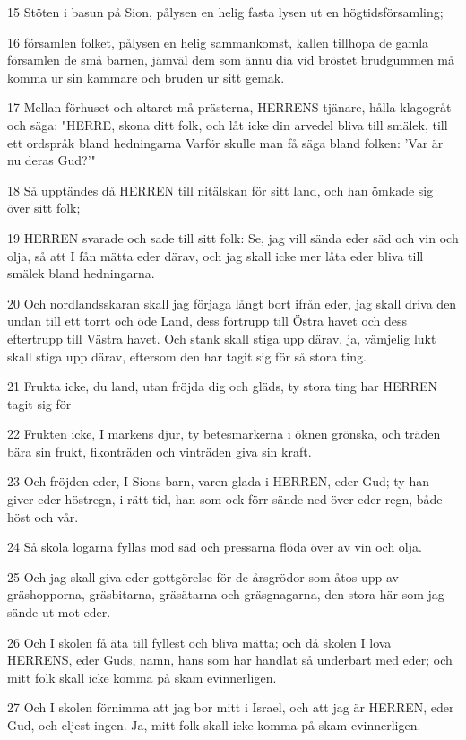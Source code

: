 \par 15 Stöten i basun på Sion, pålysen en helig fasta lysen ut en högtidsförsamling;
\par 16 församlen folket, pålysen en helig sammankomst, kallen tillhopa de gamla församlen de små barnen, jämväl dem som ännu dia vid bröstet brudgummen må komma ur sin kammare och bruden ur sitt gemak.
\par 17 Mellan förhuset och altaret må prästerna, HERRENS tjänare, hålla klagogråt och säga: "HERRE, skona ditt folk, och låt icke din arvedel bliva till smälek, till ett ordspråk bland hedningarna Varför skulle man få säga bland folken: 'Var är nu deras Gud?'"
\par 18 Så upptändes då HERREN till nitälskan för sitt land, och han ömkade sig över sitt folk;
\par 19 HERREN svarade och sade till sitt folk: Se, jag vill sända eder säd och vin och olja, så att I fån mätta eder därav, och jag skall icke mer låta eder bliva till smälek bland hedningarna.
\par 20 Och nordlandsskaran skall jag förjaga långt bort ifrån eder, jag skall driva den undan till ett torrt och öde Land, dess förtrupp till Östra havet och dess eftertrupp till Västra havet. Och stank skall stiga upp därav, ja, vämjelig lukt skall stiga upp därav, eftersom den har tagit sig för så stora ting.
\par 21 Frukta icke, du land, utan fröjda dig och gläds, ty stora ting har HERREN tagit sig för
\par 22 Frukten icke, I markens djur, ty betesmarkerna i öknen grönska, och träden bära sin frukt, fikonträden och vinträden giva sin kraft.
\par 23 Och fröjden eder, I Sions barn, varen glada i HERREN, eder Gud; ty han giver eder höstregn, i rätt tid, han som ock förr sände ned över eder regn, både höst och vår.
\par 24 Så skola logarna fyllas mod säd och pressarna flöda över av vin och olja.
\par 25 Och jag skall giva eder gottgörelse för de årsgrödor som åtos upp av gräshopporna, gräsbitarna, gräsätarna och gräsgnagarna, den stora här som jag sände ut mot eder.
\par 26 Och I skolen få äta till fyllest och bliva mätta; och då skolen I lova HERRENS, eder Guds, namn, hans som har handlat så underbart med eder; och mitt folk skall icke komma på skam evinnerligen.
\par 27 Och I skolen förnimma att jag bor mitt i Israel, och att jag är HERREN, eder Gud, och eljest ingen. Ja, mitt folk skall icke komma på skam evinnerligen.
